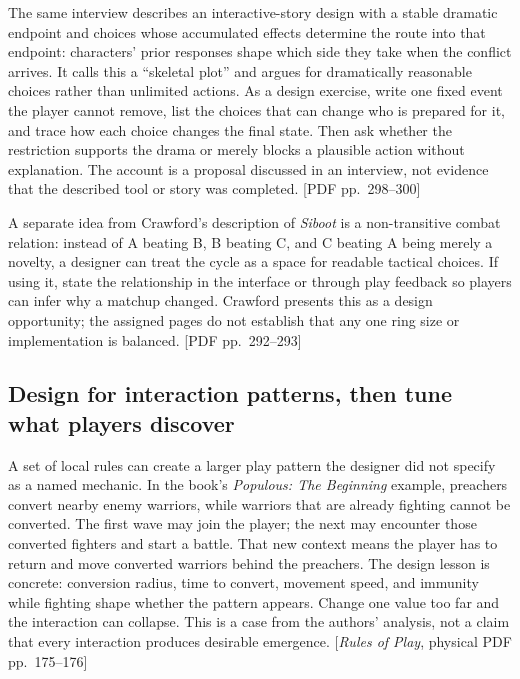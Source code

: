 The same interview describes an interactive-story design with a stable dramatic endpoint and choices whose accumulated effects determine the route into that endpoint: characters' prior responses shape which side they take when the conflict arrives. It calls this a ``skeletal plot'' and argues for dramatically reasonable choices rather than unlimited actions. As a design exercise, write one fixed event the player cannot remove, list the choices that can change who is prepared for it, and trace how each choice changes the final state. Then ask whether the restriction supports the drama or merely blocks a plausible action without explanation. The account is a proposal discussed in an interview, not evidence that the described tool or story was completed. {[}PDF pp.~298--300{]}

A separate idea from Crawford's description of \emph{Siboot} is a non-transitive combat relation: instead of A beating B, B beating C, and C beating A being merely a novelty, a designer can treat the cycle as a space for readable tactical choices. If using it, state the relationship in the interface or through play feedback so players can infer why a matchup changed. Crawford presents this as a design opportunity; the assigned pages do not establish that any one ring size or implementation is balanced. {[}PDF pp.~292--293{]}

\subsection{Design for interaction patterns, then tune what players discover}\label{design-for-interaction-patterns-then-tune-what-players-discover}

A set of local rules can create a larger play pattern the designer did not specify as a named mechanic. In the book's \emph{Populous: The Beginning} example, preachers convert nearby enemy warriors, while warriors that are already fighting cannot be converted. The first wave may join the player; the next may encounter those converted fighters and start a battle. That new context means the player has to return and move converted warriors behind the preachers. The design lesson is concrete: conversion radius, time to convert, movement speed, and immunity while fighting shape whether the pattern appears. Change one value too far and the interaction can collapse. This is a case from the authors' analysis, not a claim that every interaction produces desirable emergence. {[}\emph{Rules of Play}, physical PDF pp.~175--176{]}

